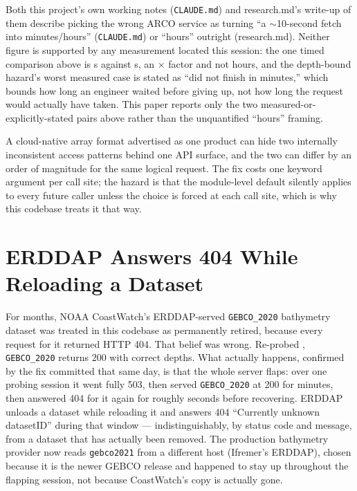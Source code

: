 Both this project's own working
notes (\texttt{CLAUDE.md}) and research.md's write-up of them describe
picking the wrong ARCO service as turning ``a $\sim$10-second fetch into
minutes/hours'' (\texttt{CLAUDE.md}) or ``hours'' outright (research.md).
Neither figure is supported by any measurement located this session: the one
timed comparison above is \ArcoGeoSeriesSeconds{}s against
\ArcoTimeSeriesSeconds{}s, an \ArcoSlowdownFactor{}$\times$ factor and not
hours, and the depth-bound hazard's worst measured case is stated as ``did
not finish in \ReanalysisUnboundedMinutes{} minutes,'' which bounds how long
an engineer waited before giving up, not how long the request would actually
have taken. This paper reports only the two measured-or-explicitly-stated
pairs above rather than the unquantified ``hours'' framing.

 A cloud-native array format advertised as one product
can hide two internally inconsistent access patterns behind one API surface,
and the two can differ by an order of magnitude for the same logical
request. The fix costs one keyword argument per call site; the hazard is
that the module-level default silently applies to every future caller unless
the choice is forced at each call site, which is why this codebase treats it
that way.

\section{ERDDAP Answers 404 While Reloading a Dataset}
\label{sec:erddap}

 For months, NOAA CoastWatch's ERDDAP-served
\texttt{GEBCO\_2020} bathymetry dataset was treated in this codebase as
permanently retired, because every request for it returned HTTP 404. That
belief was wrong. Re-probed \GebcoReprobeDate{}, \texttt{GEBCO\_2020} returns
200 with correct depths. What actually happens, confirmed by the fix
committed that same day, is that the whole server flaps: over one probing
session it went fully 503, then served \texttt{GEBCO\_2020} at 200 for
minutes, then answered 404 for it again for roughly \ErddapFlapSeconds{}
seconds before recovering. ERDDAP unloads a dataset while reloading it and
answers 404 ``Currently unknown datasetID'' during that window ---
indistinguishably, by status code and message, from a dataset that has
actually been removed. The production bathymetry provider now reads
\texttt{gebco2021} from a different host (Ifremer's ERDDAP), chosen because
it is the newer GEBCO release and happened to stay up throughout the
flapping session, not because CoastWatch's copy is actually gone.

